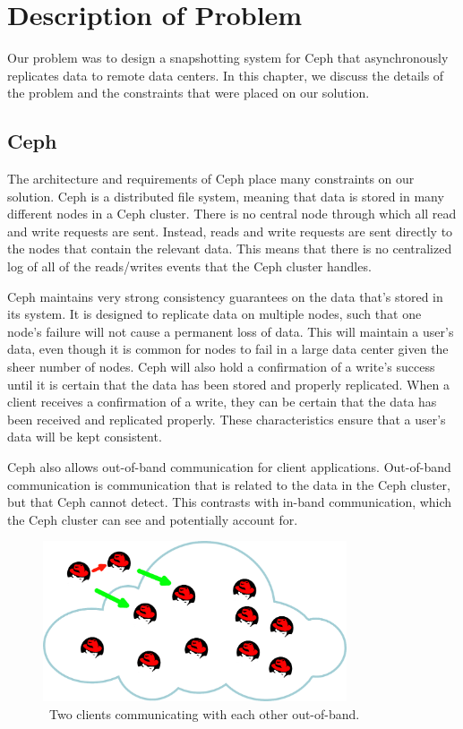 \chapter{Description of Problem}
\label{sec:description}

Our problem was to design a snapshotting system for Ceph that asynchronously
replicates data to remote data centers. In this chapter, we discuss the details
of the problem and the constraints that were placed on our solution. 

\section{Ceph}

The architecture and requirements of Ceph place many constraints on our
solution. Ceph is a distributed file system, meaning that data is stored in
many different nodes in a Ceph cluster. There
is no central node through which all read and write requests are sent. 
Instead, reads and write requests are sent directly to the nodes that contain
the relevant data. This means that there is no centralized log of all of the
reads/writes events that the Ceph cluster handles.

Ceph maintains very strong consistency guarantees on the data that's 
stored in its system. It is designed to replicate data on multiple nodes, such 
that one node's failure will not cause a permanent loss of data. This will 
maintain a user's data, even though it is common for nodes to fail in a large 
data center given the sheer number of nodes. Ceph will also hold a
confirmation of a write's success until it is certain that the data has been 
stored and properly replicated. When a client receives a confirmation of a write, they can be certain that the data has been received and replicated properly. These characteristics ensure that a user's 
data will be kept consistent.

Ceph also allows out-of-band communication for client applications. 
Out-of-band communication is communication that is related to the data in the 
Ceph cluster, but that Ceph cannot detect. This contrasts with in-band
communication, which the Ceph cluster can see and potentially account for. 

\begin{figure}[!htbp]
  \centering
  \caption{~Two clients communicating with each other out-of-band.} 
  \label{fig:out-of-band}
  \includegraphics[width=0.8\textwidth]{outofbandwrite.png}
\end{figure}

